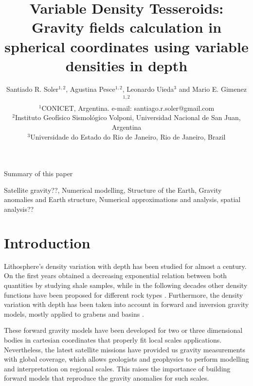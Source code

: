 \documentclass[extra]{gji}
\begin{document}
\title[Variable Density Tesseroids]{
    Variable Density Tesseroids: Gravity fields calculation in spherical coordinates using variable densities in depth
}
\author[S.R. Soler, A. Pesce, L. Uieda and M.E. Gimenez]{
    Santiado R. Soler$^{1,2}$, Agustina Pesce$^{1,2}$, Leonardo Uieda$^3$ and Mario E. Gimenez$^{1,2}$ \\
    $^1$CONICET, Argentina. e-mail: santiago.r.soler@gmail.com\\
    $^2$Instituto Geofísico Sismológico Volponi, Universidad Nacional de San Juan, Argentina\\
    $^3$Universidade do Estado do Rio de Janeiro, Rio de Janeiro, Brazil
    }


\maketitle

\begin{summary}
Summary of this paper 
\end{summary}

\begin{keywords}
Satellite gravity??, Numerical modelling, Structure of the Earth, Gravity anomalies and Earth structure, Numerical approximations and analysis, spatial analysis??
\end{keywords}


\section{Introduction}

Lithosphere's density variation with depth has been studied for almost a century. 
On the first years \citet{Athy1930} obtained a decreasing exponential relation between both quantities by studying shale samples, while in the following decades other density functions have been proposed for different rock types \citep[e.g.,][]{Maxant1980, Rao1986, Rao1993, Rao1994}.
Furthermore, the density variation with depth has been taken into account in forward and inversion gravity models, mostly applied to grabens and basins \citep{Cordell1973, Rao1986, Cowie1990, Rao1993, Rao1994, Zhang2001, Welford2010}.

These forward gravity models have been developed for two or three dimensional bodies in cartesian coordinates that properly fit local scales applications.
Nevertheless, the latest satellite missions have provided us gravity measurements with global coverage, which allows geologists and geophysics to perform modelling and interpretation on regional scales.
This raises the importance of building forward models that reproduce the gravity anomalies for such scales.
\end{document}
